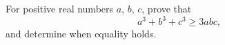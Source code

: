 For positive real numbers $a$, $b$, $c$, prove that
\[a^3+b^3+c^3\ge3abc,\]
and determine when equality holds.
